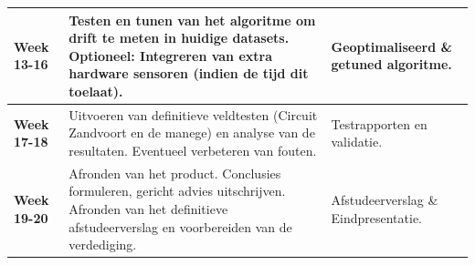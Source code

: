 \begin{table}[htbp]
\begin{tabular}{@{} l p{8cm} p{4cm} @{}}
        \textbf{Week 13-16} & Testen en tunen van het algoritme om drift te meten in huidige datasets. Optioneel: Integreren van extra hardware sensoren (indien de tijd dit toelaat). & Geoptimaliseerd \& getuned algoritme.  \\
        \midrule
        
        \textbf{Week 17-18} & Uitvoeren van definitieve veldtesten (Circuit Zandvoort en de manege) en analyse van de resultaten. Eventueel verbeteren van fouten. & Testrapporten en validatie. \\
        \midrule
        
        \textbf{Week 19-20} & Afronden van het product. Conclusies formuleren, gericht advies uitschrijven. Afronden van het definitieve afstudeerverslag en voorbereiden van de verdediging. & Afstudeerverslag \& Eindpresentatie. \\
        \bottomrule
    \end{tabular}
\end{table}


\newpage
